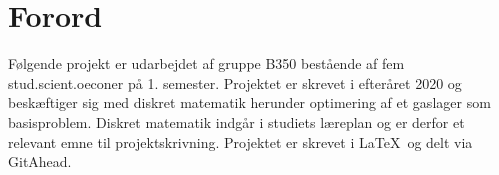 \chapter{Forord}
Følgende projekt er udarbejdet af gruppe B350 bestående af fem stud.scient.oeconer på 1. semester. Projektet er skrevet i efteråret 2020 og beskæftiger sig med diskret matematik herunder optimering af et gaslager som basisproblem. Diskret matematik indgår i studiets læreplan og er derfor et relevant emne til projektskrivning. Projektet er skrevet i \LaTeX \ og delt via GitAhead.







%
%
%
%
%
%
%
